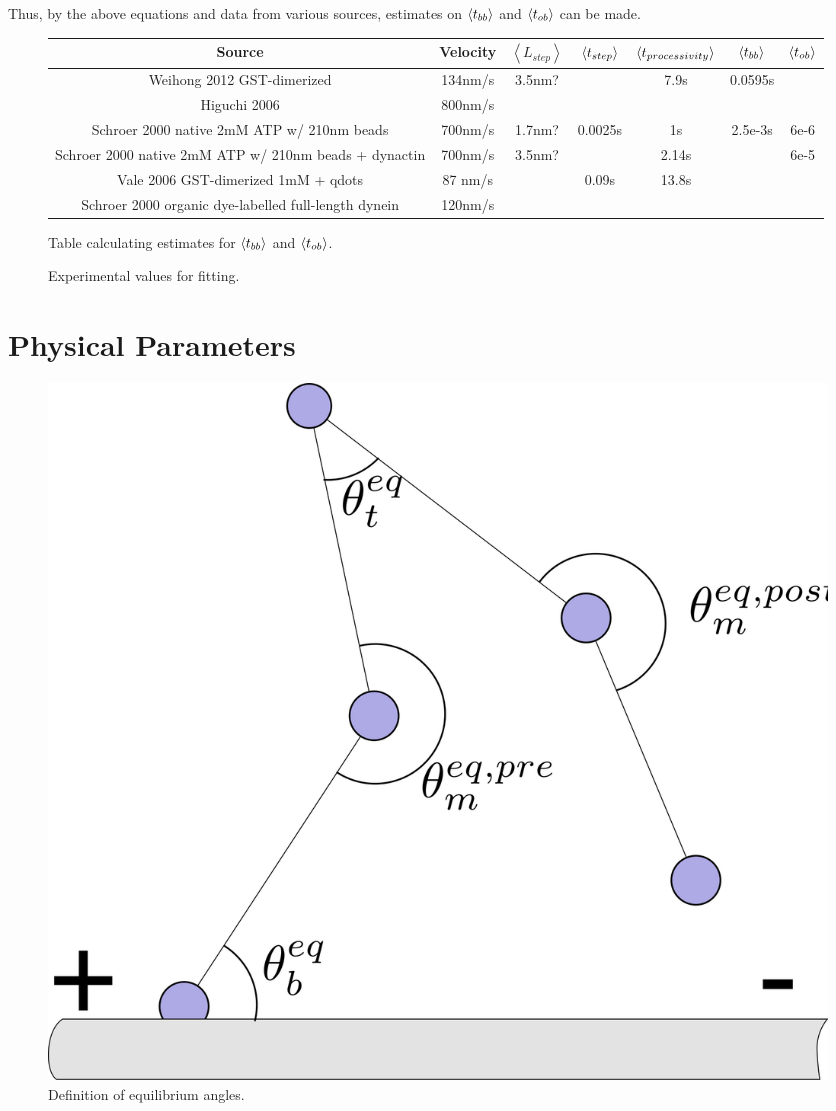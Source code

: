 \documentclass[10pt]{article} %
\begin{document}
Thus, by the above equations and data from various sources, estimates on $\left<t_{bb}\right>$ and $\left<t_{ob}\right>$ can be made.\\

\begin{figure}[h]
  \centering
  \begin{tabular}{| c | c | c | c | c | c | c |}
    \hline
    Source & Velocity & $\left<L_{step}\right>$ & $\left<t_{step}\right>$ & $\left<t_{processivity}\right>$ & $\left<t_{bb}\right>$ & $\left<t_{ob}\right>$ \\ \hline
    Weihong 2012 GST-dimerized & 134nm/s & 3.5nm? &  & 7.9s & 0.0595s & \\ \hline
    Higuchi 2006 & 800nm/s &  &  &   &   & \\ \hline
    Schroer 2000 native 2mM ATP w/ 210nm beads            & 700nm/s & 1.7nm? & 0.0025s & 1s    & 2.5e-3s & 6e-6\\ \hline
    Schroer 2000 native 2mM ATP w/ 210nm beads + dynactin & 700nm/s & 3.5nm? &  & 2.14s &  & 6e-5\\ \hline
    Vale    2006 GST-dimerized 1mM + qdots                & 87 nm/s &  & 0.09s  & 13.8s & &\\ \hline
    Schroer 2000 organic dye-labelled full-length dynein & 120nm/s &  &  &  &  & \\ \hline
    
  \end{tabular}
  \caption{Experimental values for fitting.}{Table calculating estimates for $\left<t_{bb}\right>$ and $\left<t_{ob}\right>$.}
  \label{table:time-parameter-table}
\end{figure}

\section{Physical Parameters}

\begin{figure}
  \centering
  \includegraphics[width=.45\textwidth]{../elliott-thesis/figures/equilibrium-onebound}
  \caption{Definition of equilibrium angles.}
  \label{fig:eq_angles}
\end{figure}
\end{document}
